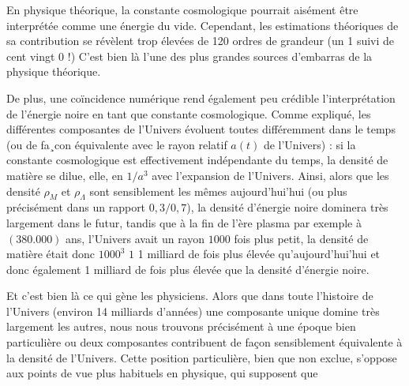 \documentclass[a4paper,12pt]{report}
\theoremstyle{plain}
\theoremstyle{plain}
\begin{document}

 En physique théorique, la constante cosmologique pourrait aisément être interprétée comme une énergie du
	vide. Cependant, les estimations théoriques de sa contribution se révèlent trop élevées de
	120 ordres de grandeur (un 1 suivi de cent vingt 0 !) C’est bien là l’une des plus grandes
	sources d’embarras de la physique théorique. 


De plus, une coïncidence numérique rend également peu crédible l’interprétation de
	l’énergie noire en tant que constante cosmologique. Comme expliqué, les différentes composantes de l’Univers évoluent toutes différemment dans
	le temps (ou de fa¸con équivalente avec le rayon relatif $a(t)$ de l’Univers) : si la constante
	cosmologique est effectivement indépendante du temps, la densité de matière se dilue,
	elle, en $1/a^{3}$ avec l’expansion de l’Univers. Ainsi, alors que les densité $\rho_{M}$ et $\rho_{\Lambda}$ 
sont
	sensiblement les mêmes aujourd'hui’hui (ou plus précisément dans un rapport $0, 3/0, 7$), la
	densité d’énergie noire dominera très largement dans le futur, tandis que à la fin de l’ère
	plasma par exemple à $( 380.000)$ ans, l’Univers avait un rayon $1000$ fois plus petit, la
	densité de matière était donc $1000^{3}$
	$1$ 1 milliard de fois plus élevée qu’aujourd'hui’hui
	et donc également 1 milliard de fois plus élevée que la densité d’énergie noire.

Et c’est
	bien là ce qui gène les physiciens. Alors que dans toute l’histoire de l’Univers (environ 14
	milliards d’années) une composante unique domine très largement les autres, nous nous
	trouvons précisément à une époque bien particulière ou deux composantes contribuent de
	façon sensiblement équivalente à la densité de l’Univers. Cette position particulière, bien
	que non exclue, s’oppose aux points de vue plus habituels en physique, qui supposent que
\end{document}
